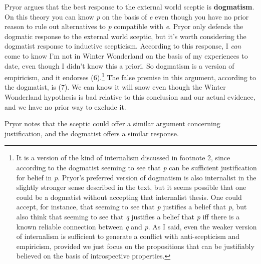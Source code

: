 Pryor argues that the best response to the external world sceptic is \textbf{dogmatism}. On this theory you can know \textit{p} on the basis of \textit{e} even though you have no prior reason to rule out alternatives to \textit{p} compatible with \textit{e}. Pryor only defends the dogmatic response to the external world sceptic, but it's worth considering the dogmatist response to inductive scepticism. According to this response, I \textit{can }come to know I'm not in Winter Wonderland on the basis of my experiences to date, even though I didn't know this a priori. So dogmatism is a version of empiricism, and it endorses (6).\footnote{It is a version of the kind of internalism discussed in footnote 2, since according to the dogmatist seeming to see that \textit{p} can be sufficient justification for belief in \textit{p}. Pryor's preferred version of dogmatism is also internalist in the slightly stronger sense described in the text, but it seems possible that one could be a dogmatist without accepting that internalist thesis. One could accept, for instance, that seeming to see that \textit{p} justifies a belief that \textit{p}, but also think that seeming to see that \textit{q} justifies a belief that \textit{p} iff there is a known reliable connection between \textit{q} and \textit{p}. As I said, even the weaker version of internalism is sufficient to generate a conflict with anti-scepticism and empiricism, provided we just focus on the propositions that can be justifiably believed on the basis of introspective properties.} The false premise in this argument, according to the dogmatist, is (7). We can know it will snow even though the Winter Wonderland hypothesis is bad relative to this conclusion and our actual evidence, and we have no prior way to exclude it.

Pryor notes that the sceptic could offer a similar argument concerning justification, and the dogmatist offers a similar response. 

\bigskip



